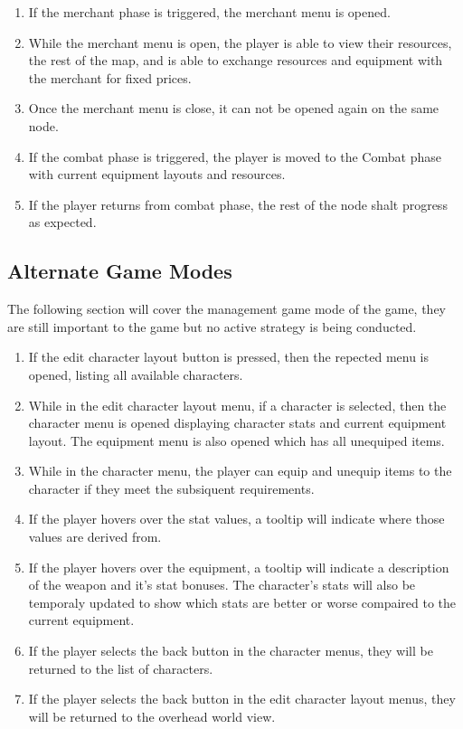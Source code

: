 \documentclass{article}
\begin{document}
\begin{enumerate}[{PGR}1. ]
	\item If the merchant phase is triggered, the merchant menu is opened.
	\item While the merchant menu is open, the player is able to view their resources, the rest of the map, and is able to exchange resources and equipment with the merchant for fixed prices.
	\item Once the merchant menu is close, it can not be opened again on the same node.
	\item If the combat phase is triggered, the player is moved to the Combat phase with current equipment layouts and resources.
	\item If the player returns from combat phase, the rest of the node shalt progress as expected.
\end{enumerate}
\subsection{Alternate Game Modes}
\quad The following section will cover the management game mode of the game, they are still important to the game but no active strategy is being conducted.
\begin{enumerate}[{AGR}1. ]
	\item If the edit character layout button is pressed, then the repected menu is opened, listing all available characters.
	\item While in the edit character layout menu, if a character is selected, then the character menu is opened displaying character stats and current equipment layout. The equipment menu is also opened which has all unequiped items.
	\item While in the character menu, the player can equip and unequip items to the character if they meet the subsiquent requirements.
	\item If the player hovers over the stat values, a tooltip will indicate where those values are derived from.
	\item If the player hovers over the equipment, a tooltip will indicate a description of the weapon and it's stat bonuses. The character's stats will also be temporaly updated to show which stats are better or worse compaired to the current equipment.
	\item If the player selects the back button in the character menus, they will be returned to the list of characters.
	\item  If the player selects the back button in the edit character layout menus, they will be returned to the overhead world view.
\end{enumerate}
\end{document}
